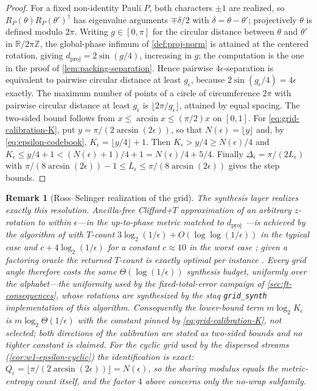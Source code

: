 \documentclass[aps,prx,reprint,floatfix,superscriptaddress]{revtex4-2}
\newtheorem{remark}{Remark}
\begin{document}
\begin{proof}
For a fixed non-identity Pauli $P$, both characters $\pm1$ are realized,
so $R_P(\theta)R_P(\theta')^\dagger$ has eigenvalue arguments
$\mp\delta/2$ with $\delta=\theta-\theta'$; projectively $\theta$ is
defined modulo $2\pi$.  Writing $g\in[0,\pi]$ for the circular distance
between $\theta$ and $\theta'$ in $\mathbb R/2\pi\mathbb Z$, the
global-phase infimum of \cref{def:proj-norm} is attained at the centered
rotation, giving $d_{\mathrm{proj}}=2\sin(g/4)$, increasing in $g$; the
computation is the one in the proof of \cref{lem:packing-separation}.
Hence pairwise $4\epsilon$-separation is equivalent to pairwise circular
distance at least $g_\epsilon$, because $2\sin(g_\epsilon/4)=4\epsilon$
exactly.  The maximum number of points of a circle of circumference
$2\pi$ with pairwise circular distance at least $g_\epsilon$ is
$\lfloor2\pi/g_\epsilon\rfloor$, attained by equal spacing.  The
two-sided bound follows from $x\leq\arcsin x\leq(\pi/2)x$ on $[0,1]$.
For \eqref{eq:grid-calibration-K}, put $y=\pi/(2\arcsin(2\epsilon))$, so
that $N(\epsilon)=\lfloor y\rfloor$ and, by
\eqref{eq:epsilon-codebook}, $K_\epsilon=\lfloor y/4\rfloor+1$.  Then
$K_\epsilon>y/4\geq N(\epsilon)/4$ and
$K_\epsilon\leq y/4+1<(N(\epsilon)+1)/4+1=N(\epsilon)/4+5/4$.  Finally
$\Delta_\epsilon=\pi/(2L_\epsilon)$ with
$\pi/(8\arcsin(2\epsilon))-1\leq L_\epsilon
\leq\pi/(8\arcsin(2\epsilon))$ gives the step bounds.
\end{proof}

\begin{remark}[Ross--Selinger realization of the grid]
\label{rem:rs-grid}
The synthesis layer realizes exactly this resolution.  Ancilla-free
Clifford+$T$ approximation of an arbitrary $z$-rotation to within
$\epsilon$---in the up-to-phase metric matched to $d_{\mathrm{proj}}$
\cite[Def.~9.1, Cor.~9.5, Alg.~9.8]{ross2016optimal}---is achieved by
the algorithm of \cite[Alg.~7.6]{ross2016optimal} with $T$-count
$3\log_2(1/\epsilon)+O(\log\log(1/\epsilon))$ in the typical case and
$c+4\log_2(1/\epsilon)$ for a constant $c\approx10$ in the worst case
\cite[Prop.~8.8 and \S8.3]{ross2016optimal}; given a factoring oracle
the returned $T$-count is exactly optimal per instance
\cite[Prop.~8.2]{ross2016optimal}.  Every grid angle therefore costs the
same $\Theta(\log(1/\epsilon))$ synthesis budget, uniformly over the
alphabet---the uniformity used by the fixed-total-error campaign of
\cref{sec:ft-consequences}, whose rotations are synthesized by the staq
\texttt{grid\_synth} implementation of this algorithm.  Consequently the
lower-bound term $m\log_2K_\epsilon$ is $m\log_2\Theta(1/\epsilon)$ with
the constant pinned by \eqref{eq:grid-calibration-K}, not selected; both
directions of the calibration are stated as two-sided bounds and no
tighter constant is claimed.  For the cyclic grid used by the dispersed
streams (\cref{cor:w1-epsilon-cyclic}) the identification is exact:
$Q_\epsilon=\lfloor\pi/(2\arcsin(2\epsilon))\rfloor=N(\epsilon)$, so the
sharing modulus equals the metric-entropy count itself, and the factor
$4$ above concerns only the no-wrap subfamily.
\end{remark}
\end{document}
